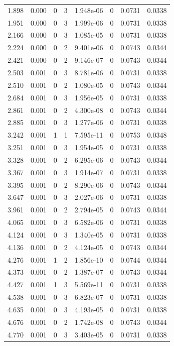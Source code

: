 \documentclass[preview]{standalone}
\begin{document}
{{\begin{tabular}{L{1.2cm}C{1.2cm} C{0.3cm}C{0.5cm} C{1.4cm}C{1.4cm} C{1.4cm}C{1.4cm}}
  1.898  &  0.000  & 0     &  3 &  1.948e-06  & 0  & 0.0731 &  0.0338   \\ 
  1.951  &  0.000  & 0     &  3 &  1.999e-06  & 0  & 0.0731 &  0.0338   \\ 
  2.166  &  0.000  & 0     &  3 &  1.085e-05  & 0  & 0.0731 &  0.0338   \\ 
  2.224  &  0.000  & 0     &  2 &  9.401e-06  & 0  & 0.0743 &  0.0344   \\ 
  2.421  &  0.000  & 0     &  2 &  9.146e-07  & 0  & 0.0743 &  0.0344   \\ 
  2.503  &  0.001  & 0     &  3 &  8.781e-06  & 0  & 0.0731 &  0.0338   \\ 
  2.510  &  0.001  & 0     &  2 &  1.080e-05  & 0  & 0.0743 &  0.0344   \\ 
  2.684  &  0.001  & 0     &  3 &  1.956e-05  & 0  & 0.0731 &  0.0338   \\ 
  2.861  &  0.001  & 0     &  2 &  4.300e-08  & 0  & 0.0743 &  0.0344   \\ 
  2.885  &  0.001  & 0     &  3 &  1.277e-06  & 0  & 0.0731 &  0.0338   \\ 
  3.242  &  0.001  & 1     &  1 &  7.595e-11  & 0  & 0.0753 &  0.0348   \\ 
  3.251  &  0.001  & 0     &  3 &  1.954e-05  & 0  & 0.0731 &  0.0338   \\ 
  3.328  &  0.001  & 0     &  2 &  6.295e-06  & 0  & 0.0743 &  0.0344   \\ 
  3.367  &  0.001  & 0     &  3 &  1.914e-07  & 0  & 0.0731 &  0.0338   \\ 
  3.395  &  0.001  & 0     &  2 &  8.290e-06  & 0  & 0.0743 &  0.0344   \\ 
  3.647  &  0.001  & 0     &  3 &  2.027e-06  & 0  & 0.0731 &  0.0338   \\ 
  3.961  &  0.001  & 0     &  2 &  2.794e-05  & 0  & 0.0743 &  0.0344   \\ 
  4.065  &  0.001  & 0     &  3 &  6.582e-06  & 0  & 0.0731 &  0.0338   \\ 
  4.124  &  0.001  & 0     &  3 &  1.340e-05  & 0  & 0.0731 &  0.0338   \\ 
  4.136  &  0.001  & 0     &  2 &  4.124e-05  & 0  & 0.0743 &  0.0344   \\ 
  4.276  &  0.001  & 1     &  2 &  1.856e-10  & 0  & 0.0744 &  0.0344   \\ 
  4.373  &  0.001  & 0     &  2 &  1.387e-07  & 0  & 0.0743 &  0.0344   \\ 
  4.427  &  0.001  & 1     &  3 &  5.569e-11  & 0  & 0.0731 &  0.0338   \\ 
  4.538  &  0.001  & 0     &  3 &  6.823e-07  & 0  & 0.0731 &  0.0338   \\ 
  4.635  &  0.001  & 0     &  3 &  4.193e-05  & 0  & 0.0731 &  0.0338   \\ 
  4.676  &  0.001  & 0     &  2 &  1.742e-08  & 0  & 0.0743 &  0.0344   \\ 
  4.770  &  0.001  & 0     &  3 &  3.403e-05  & 0  & 0.0731 &  0.0338   \\ 
\hline 
\end{tabular} 

}}
\end{document}
